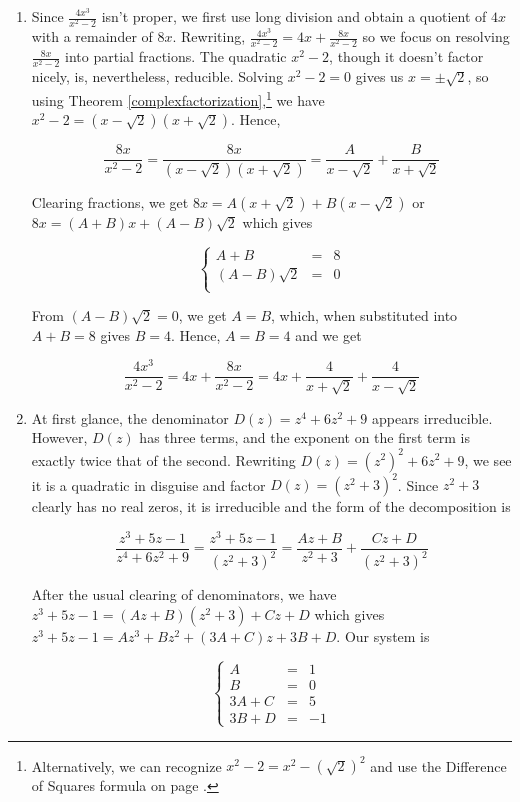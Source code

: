 \begin{ex}
\begin{enumerate}
\item  Since  $\frac{4x^3}{x^2-2}$ isn't proper, we first use long division and obtain a quotient of $4x$ with a remainder of $8x$.  Rewriting,  $\frac{4x^3}{x^2-2} = 4x + \frac{8x}{x^2-2}$ so we focus on resolving $\frac{8x}{x^2-2}$ into partial fractions.  The quadratic $x^2-2$, though it doesn't factor nicely, is, nevertheless, reducible. Solving $x^2-2 =0$ gives us $x = \pm \sqrt{2}$, so using Theorem \ref{complexfactorization},\footnote{Alternatively, we can recognize $x^2-2 = x^2-(\sqrt{2})^2$ and use the Difference of Squares formula on page \pageref{CommonFactoringFormulas}.} we have $x^2-2 = \left(x - \sqrt{2}\right)\left(x + \sqrt{2}\right)$. Hence,

\[ \dfrac{8x}{x^2-2} = \dfrac{8x}{ \left(x - \sqrt{2}\right)\left(x + \sqrt{2}\right)} = \dfrac{A}{x - \sqrt{2}} + \dfrac{B}{x + \sqrt{2}} \]

Clearing fractions, we get $8x = A\left(x + \sqrt{2}\right) + B\left(x - \sqrt{2}\right)$ or $8x = (A+B)x + (A-B)\sqrt{2}$ which gives


\[ \left\{ \begin{array}{rcr}  A+B & = & 8 \\ (A-B)\sqrt{2} & = & 0 \\ \end{array} \right.\]

From $(A-B)\sqrt{2}=0$, we get $A=B$, which, when substituted into $A+B = 8$ gives $B = 4$.  Hence, $A = B = 4$ and we get

\[\dfrac{4x^3}{x^2-2} = 4x + \dfrac{8x}{x^2-2} = 4x + \dfrac{4}{x + \sqrt{2}} + \dfrac{4}{x - \sqrt{2}}\]

\item  At first glance, the denominator $D(z) = z^4+6z^2+9$ appears irreducible. However, $D(z)$ has three terms, and the exponent on the first term is exactly twice that of the second.  Rewriting $D(z) = \left(z^2\right)^2 + 6z^2 + 9$, we see it is a quadratic in disguise and factor $D(z) = \left(z^2+3\right)^2$.  Since $z^2+3$ clearly has no real zeros, it is irreducible and the form of the decomposition is

\[ \dfrac{z^3+5z-1}{z^4+6z^2+9} =  \dfrac{z^3+5z-1}{\left(z^2+3\right)^2} = \dfrac{Az+B}{z^2+3} + \dfrac{Cz+D}{\left(z^2+3\right)^2}\]

After the usual clearing of denominators, we have $z^3 + 5z-1 = (Az+B)\left(z^2+3\right) + Cz + D$ which gives $z^3+5z-1 = Az^3 + Bz^2 + (3A+C)z + 3B+D$.  Our system is 

\[ \left\{ \begin{array}{rcr} A & = & 1 \\ B & = & 0 \\ 3A + C & = & 5 \\ 3B+D & = & -1 \end{array} \right.\]


\end{enumerate}
\end{ex}
